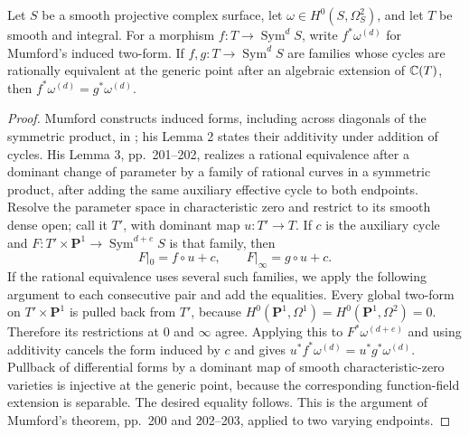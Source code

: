 \begin{lemma}\label{lem:B2-mumford}
Let $S$ be a smooth projective complex surface, let
$\omega\in H^0(S,\Omega_S^2)$, and let $T$ be smooth and integral.
For a morphism $f:T\to\operatorname{Sym}^d S$, write $f^*\omega^{(d)}$
for Mumford's induced two-form. If $f,g:T\to\operatorname{Sym}^d S$
are families whose cycles are rationally equivalent at the generic
point after an algebraic extension of ${\mathbb{C}}(T)$, then
$f^*\omega^{(d)}=g^*\omega^{(d)}$.
\end{lemma}
\begin{proof}
Mumford constructs induced forms, including across diagonals of the
symmetric product, in \cite[\S1, pp.~197--199]{BMumford1969}; his Lemma 2
states their additivity under addition of cycles. His Lemma 3,
pp.~201--202, realizes a rational equivalence after a dominant change of
parameter by a family of rational curves in a symmetric product, after
adding the same auxiliary effective cycle to both endpoints.
Resolve the parameter space in characteristic zero and restrict to its
smooth dense open; call it $T'$, with dominant map $u:T'\to T$.
If $c$ is the auxiliary cycle and
$F:T'\times\mathbf P^1\to\operatorname{Sym}^{d+e}S$ is that family,
then
\[
 F|_0=f\circ u+c,\qquad F|_\infty=g\circ u+c.
\]
If the rational equivalence uses several such families, we apply the
following argument to each consecutive pair and add the equalities.
Every global two-form on $T'\times\mathbf P^1$ is pulled back from
$T'$, because $H^0(\mathbf P^1,\Omega^1)=
H^0(\mathbf P^1,\Omega^2)=0$. Therefore its restrictions at $0$ and
$\infty$ agree. Applying this to $F^*\omega^{(d+e)}$ and using
additivity cancels the form induced by $c$ and gives
$u^*f^*\omega^{(d)}=u^*g^*\omega^{(d)}$.
Pullback of differential forms by a dominant map of smooth
characteristic-zero varieties is injective at the generic point,
because the corresponding function-field extension is separable.
The desired equality follows. This is the argument of Mumford's
theorem, pp.~200 and 202--203, applied to two varying endpoints.
\end{proof}

